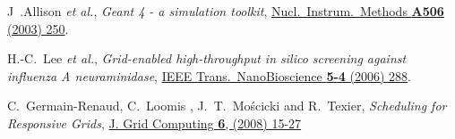 \documentclass{elsart}
\def\etal {\textit{et al.}}
\begin{document}
\begin{thebibliography}{00}
 J~.Allison \etal,
\textit{Geant 4 - a simulation toolkit},
\href{http://dx.doi.org/10.1016/S0168-9002(03)01368-8}
{Nucl.\ Instrum.\ Methods \textbf{A506} (2003) 250}.

 H.-C.\ Lee \etal,
\textit{Grid-enabled high-throughput in silico screening against influenza A
neuraminidase},
\href{http://dx.doi.org/10.1109/TNB.2006.887943}
{IEEE Trans.\ NanoBioscience \textbf{5-4} (2006) 288}.

  C.~Germain-Renaud, C.~Loomis , J.~T.~Mo{\'s}cicki and R.~Texier,
\textit{Scheduling for Responsive Grids}, 
\href{http://dx/doi.org/10.1007/s10723-007-9086-4}
{J. Grid Computing \textbf{6}, (2008) 15-27 }







\end{thebibliography}
\end{document}
